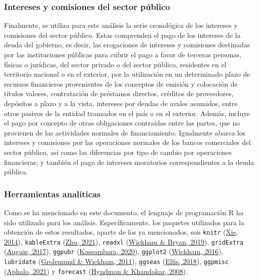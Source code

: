 \documentclass[
]{article}
\begin{document}
\subsubsection{Intereses y comisiones del sector público}

Finalmente, se utiliza para este análisis la serie cronológica de los
intereses y comisiones del sector público. Estas comprenden el pago de
los intereses de la deuda del gobierno, es decir, las erogaciones de
intereses y comisiones destinadas por las instituciones públicas para
cubrir el pago a favor de terceras personas, físicas o jurídicas, del
sector privado o del sector público, residentes en el territorio
nacional o en el exterior, por la utilización en un determinado plazo de
recursos financieros provenientes de los conceptos de emisión y
colocación de títulos valores, contratación de préstamos directos,
créditos de proveedores, depósitos a plazo y a la vista, intereses por
deudas de avales asumidos, entre otros pasivos de la entidad tranzados
en el país o en el exterior. Además, incluye el pago por concepto de
otras obligaciones contraídas entre las partes, que no provienen de las
actividades normales de financiamiento. Igualmente abarca los intereses
y comisiones por las operaciones normales de los bancos comerciales del
sector público, así como las diferencias por tipo de cambio por
operaciones financieras; y también el pago de intereses moratorios
correspondientes a la deuda pública.

\subsubsection{Herramientas analíticas}

Como se ha mencionado en este documento, el lenguaje de programación R
ha sido utilizado para los análisis. Específicamente, los paquetes
utilizados para la obtención de estos resultados, aparte de los ya
mencionados, son \texttt{knitr} (\protect\hyperlink{ref-knitr}{Xie,
2014}), \texttt{kableExtra} (\protect\hyperlink{ref-kableExtra}{Zhu,
2021}), \texttt{readxl} (\protect\hyperlink{ref-readxl}{Wickham \&
Bryan, 2019}), \texttt{gridExtra}
(\protect\hyperlink{ref-gridExtra}{Auguie, 2017}), \texttt{ggpubr}
(\protect\hyperlink{ref-ggpubr}{Kassambara, 2020}), \texttt{ggplot2}
(\protect\hyperlink{ref-ggplot2}{Wickham, 2016}), \texttt{lubridate}
(\protect\hyperlink{ref-lubridate}{Grolemund \& Wickham, 2011}),
\texttt{ggseas} (\protect\hyperlink{ref-ggseas}{Ellis, 2018}),
\texttt{ggpmisc} (\protect\hyperlink{ref-ggpmisc}{Aphalo, 2021}) y
\texttt{forecast} (\protect\hyperlink{ref-forecast}{Hyndman \&
Khandakar, 2008}).
\end{document}
